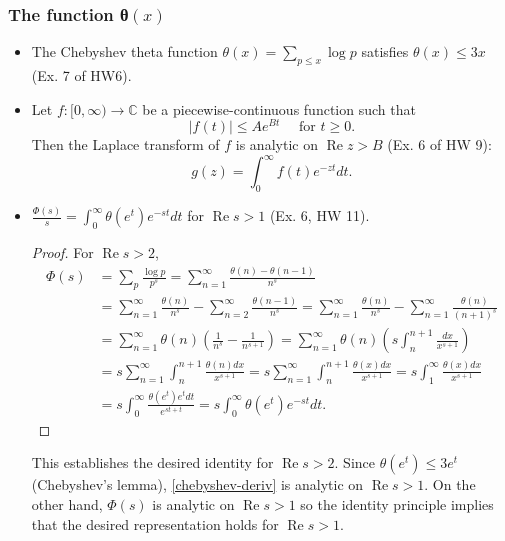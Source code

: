\documentclass[12pt]{article}
\begin{document}
\subsubsection{The function θ$(x)$}
\begin{itemize}
    \item
      The Chebyshev theta function \(\theta(x)=\sum_{p \leq x} \log p\)
      satisfies \(\theta(x) \leq 3 x\) (Ex. 7 of HW6).
    \item
      Let \(f:[0, \infty) \rightarrow \mathbb{C}\) be a piecewise-continuous
      function such that \[
      |f(t)| \leq A e^{B t} \quad \text { for } t \geq 0 .
      \] Then the Laplace transform of \(f\) is analytic on
      \(\operatorname{Re} z>B\) (Ex. 6 of HW 9): \[
      g(z)=\int_0^{\infty} f(t) e^{-z t} d t .
      \]
    \item
      \(\frac{\Phi(s)}{s}=\int_0^{\infty} \theta\left(e^t\right) e^{-s t} d t\)
      for \(\operatorname{Re} s>1\) (Ex. 6, HW 11). 
      \begin{proof}
        For
      \(\operatorname{Re} s>2\), \begin{equation}\label{chebyshev-deriv}
        \begin{aligned}
            \Phi(s) & =\sum_p \frac{\log p}{p^s}=\sum_{n=1}^{\infty} \frac{\theta(n)-\theta(n-1)}{n^s} \\
            & =\sum_{n=1}^{\infty} \frac{\theta(n)}{n^s}-\sum_{n=2}^{\infty} \frac{\theta(n-1)}{n^s}=\sum_{n=1}^{\infty} \frac{\theta(n)}{n^s}-\sum_{n=1}^{\infty} \frac{\theta(n)}{(n+1)^s} \\
            & =\sum_{n=1}^{\infty} \theta(n)\left(\frac{1}{n^s}-\frac{1}{n^{s+1}}\right)=\sum_{n=1}^{\infty} \theta(n)\left(s \int_n^{n+1} \frac{d x}{x^{s+1}}\right) \\
            & =s \sum_{n=1}^{\infty} \int_n^{n+1} \frac{\theta(n) d x}{x^{s+1}}=s \sum_{n=1}^{\infty} \int_n^{n+1} \frac{\theta(x) d x}{x^{s+1}}=s \int_1^{\infty} \frac{\theta(x) d x}{x^{s+1}} \\
            & =s \int_0^{\infty} \frac{\theta\left(e^t\right) e^t d t}{e^{s t+t}}=s \int_0^{\infty} \theta\left(e^t\right) e^{-s t} d t .
            \end{aligned}
      \end{equation}
      \end{proof}
    This establishes the desired identity for
      \(\operatorname{Re} s>2\). Since \(\theta\left(e^t\right) \leq 3 e^t\)
      (Chebyshev's lemma), \cref{chebyshev-deriv} is analytic on \(\operatorname{Re} s>1\). On
      the other hand, \(\Phi(s)\) is analytic on \(\operatorname{Re} s>1\)
      so the identity principle implies that the desired representation
      holds for \(\operatorname{Re} s>1\).
    \end{itemize}
\end{document}
